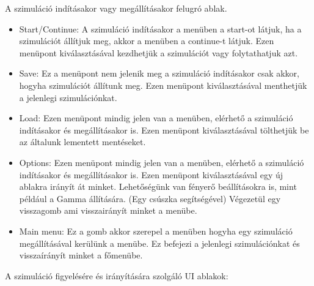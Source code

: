 
A szimuláció indításakor vagy megállításakor felugró ablak.

\begin{itemize}
    \item Start/Continue:
    A szimuláció indításakor a menüben a start-ot látjuk, ha a szimulációt állítjuk meg, akkor a menüben a continue-t látjuk.
    Ezen menüpont kiválasztásával kezdhetjük a szimulációt vagy folytathatjuk azt.
    \item Save:
    Ez a menüpont nem jelenik meg a szimuláció indításakor csak akkor, hogyha szimulációt állítunk meg.
    Ezen menüpont kiválasztásával menthetjük a jelenlegi szimulációnkat.
    \item Load:
    Ezen menüpont mindig jelen van a menüben, elérhető a szimuláció indításakor és megállításakor is.
    Ezen menüpont kiválasztásával tölthetjük be az általunk lementett mentéseket.
    \item Options:
    Ezen menüpont mindig jelen van a menüben, elérhető a szimuláció indításakor és megállításakor is.
    Ezen menüpont kiválasztásával egy új ablakra irányít át minket.
    Lehetőségünk van fényerő beállításokra is, mint például a Gamma állítására. (Egy csúszka segítségével)
    Végezetül egy visszagomb ami visszairányít minket a menübe.
    \item Main menu:
    Ez a gomb akkor szerepel a menüben hogyha egy szimuláció megállításával kerülünk a menübe.
    Ez befejezi a jelenlegi szimulációnkat és visszaírányít minket a főmenübe.
\end{itemize}


A szimuláció figyelésére és irányítására szolgáló UI ablakok:

